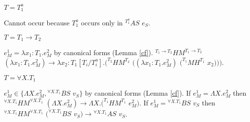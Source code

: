 \begin{case}
\begin{subcase}
$T=T_{1}^{a}$

Cannot occur because $T_{1}^{a}$ occurs only in $^{T_{1}^{a}}AS$ $e_{S}$.

\end{subcase}

\begin{subcase}

$T=T_{1}\rightarrow T_{2}$

$e_{M}^{1}=\lambda x_{1}:T_{1}.e_{M}^{2}$ by canonical forms (Lemma \ref{cf}).  $^{T_{1}\rightarrow T_{2}}HM^{T_{1}\rightarrow T_{2}}$ $(\lambda x_{1}:T_{1}.e_{M}^{2})\rightarrow\lambda x_{2}:T_{1}[T_{i}/T^{a}_{i}].(^{T_{2}}HM^{T_{2}}$ $((\lambda x_{1}:T_{1}.e_{M}^{2})$ $(^{T_{1}}MH^{T_{1}}$ $x_{2})))$.

\end{subcase}

\begin{subcase}

$T=\forall X.T_{1}$

$e_{M}^{1}\in\lbrace\Lambda X.e_{M}^{2},{^{\forall X.T_{1}}B}S$ $v_{S}\rbrace$ by canonical forms (Lemma \ref{cf}).  If $e_{M}^{1}=\Lambda X.e_{M}^{2}$ then $^{\forall X.T_{1}}HM^{\forall X.T_{1}}$ $(\Lambda X.e_{M}^{2})\rightarrow\Lambda X.(^{T_{1}}HM^{T_{1}}$ $e_{M}^{2})$.  If $e_{M}^{1}={^{\forall X.T_{1}}B}S$ $v_{S}$ then $^{\forall X.T_{1}}HM^{\forall X.T_{1}}$ $(^{\forall X.T_{1}}BS$ $v_{S})\rightarrow{^{\forall X.T_{1}}A}S$ $v_{S}$.

\end{subcase}

\end{case}